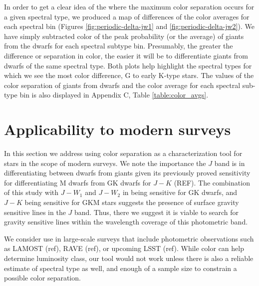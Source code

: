 In order to get a clear idea of the where the maximum color separation occurs for a given spectral type, we produced a map of differences of the color averages for each spectral bin (Figures \ref{fig:periodic-delta-jw1} and \ref{fig:periodic-delta-jw2}). We have simply subtracted color of the peak probability (or the average) of giants from the dwarfs for each spectral subtype bin. Presumably, the greater the difference or separation in color, the easier it will be to differentiate giants from dwarfs of the same spectral type. Both plots help highlight the spectral types for which we see the most color difference, G to early K-type stars. The values of the color separation of giants from dwarfs and the color average for each spectral sub-type bin is also displayed in Appendix C, Table \ref{table:color_avgs}.

\section{Applicability to modern surveys}
In this section we address using color separation as a characterization tool for stars in the scope of modern surveys. We note the importance the $J$ band is in differentiating between dwarfs from giants given its previously proved sensitivity for differentiating M dwarfs from GK dwarfs for $J-K$ (REF). The combination of this study with $J-W_{1}$ and $J-W_{2}$ in being sensitive for GK dwarfs, and $J-K$ being sensitive for GKM stars suggests the presence of surface gravity sensitive lines in the $J$ band. Thus, there we suggest it is viable to search for gravity sensitive lines within the wavelength coverage of this photometric band. 


We consider use in large-scale  surveys that include photometric observations such as LAMOST (ref), RAVE (ref), or upcoming LSST (ref). While color can help determine luminosity class, our tool would not work unless there is also a reliable estimate of spectral type as well, and enough of a sample size to constrain a possible color separation.


